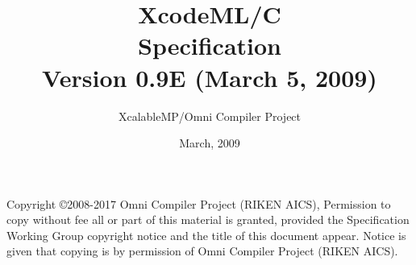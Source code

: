 \documentclass[a4paper,11pt,twoside]{article}
\title{{\Huge XcodeML/C}\\
Specification\\
\vspace{2cm}
Version 0.9E (March 5, 2009)\\ }
\author{
\Large XcalableMP/Omni Compiler Project\\
}
\date{\vspace{4cm}\Large March, 2009}
\begin{document}
\maketitle

Copyright \copyright 2008-2017 Omni Compiler Project (RIKEN AICS),
Permission to copy without fee all or part of this material is granted,
provided the {\XMP} Specification Working Group copyright notice and the
title of this document appear. Notice is given that copying is by permission
of Omni Compiler Project (RIKEN AICS).

\clearpage

\cleardoublepage

\tableofcontents
\listoffigures
\listoftables



\newpage
\mbox{}\newpage

\pagestyle{fancy}
\fancyhead{} %
\fancyhead[RE]{\leftmark}
\fancyhead[LO]{\rightmark}
\fancyhead[LE,RO]{\thepage}
\fancyfoot{} %
\renewcommand{\headrulewidth}{0pt}
\renewcommand{\footrulewidth}{0pt}












\cleardoublepage





\end{document}
